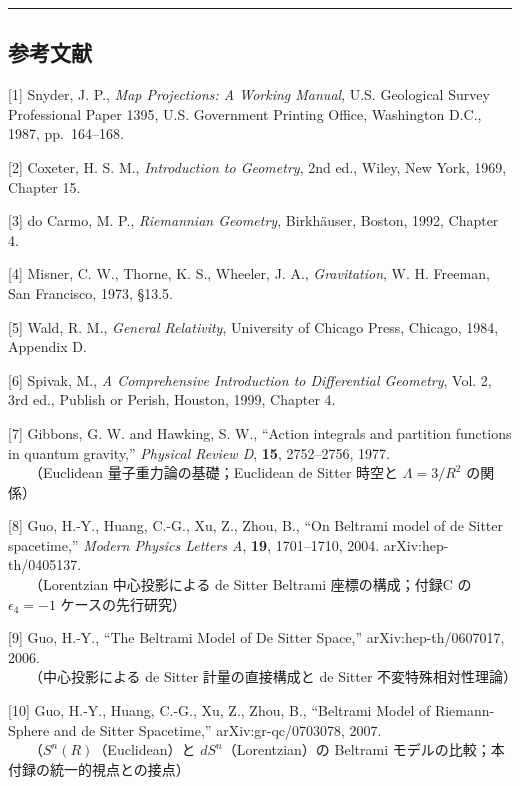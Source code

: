 \documentclass[a4paper,11pt]{ltjsarticle}
\theoremstyle{definition}
\begin{document}
\begin{center}\rule{0.5\linewidth}{0.5pt}\end{center}

\subsection{参考文献}\label{ux53c2ux8003ux6587ux732e}

{[}1{]} Snyder, J. P., \emph{Map Projections: A Working Manual}, U.S. Geological Survey Professional Paper 1395, U.S. Government Printing Office, Washington D.C., 1987, pp.~164--168.

{[}2{]} Coxeter, H. S. M., \emph{Introduction to Geometry}, 2nd ed., Wiley, New York, 1969, Chapter 15.

{[}3{]} do Carmo, M. P., \emph{Riemannian Geometry}, Birkhäuser, Boston, 1992, Chapter 4.

{[}4{]} Misner, C. W., Thorne, K. S., Wheeler, J. A., \emph{Gravitation}, W. H. Freeman, San Francisco, 1973, §13.5.

{[}5{]} Wald, R. M., \emph{General Relativity}, University of Chicago Press, Chicago, 1984, Appendix D.

{[}6{]} Spivak, M., \emph{A Comprehensive Introduction to Differential Geometry}, Vol. 2, 3rd ed., Publish or Perish, Houston, 1999, Chapter 4.

{[}7{]} Gibbons, G. W. and Hawking, S. W., ``Action integrals and partition functions in quantum gravity,'' \emph{Physical Review D}, \textbf{15}, 2752--2756, 1977.\\
　　（Euclidean 量子重力論の基礎；Euclidean de Sitter 時空と \(\Lambda = 3/R^2\) の関係）

{[}8{]} Guo, H.-Y., Huang, C.-G., Xu, Z., Zhou, B., ``On Beltrami model of de Sitter spacetime,'' \emph{Modern Physics Letters A}, \textbf{19}, 1701--1710, 2004. arXiv:hep-th/0405137.\\
　　（Lorentzian 中心投影による de Sitter Beltrami 座標の構成；付録C の \(\epsilon_4=-1\) ケースの先行研究）

{[}9{]} Guo, H.-Y., ``The Beltrami Model of De Sitter Space,'' arXiv:hep-th/0607017, 2006.\\
　　（中心投影による de Sitter 計量の直接構成と de Sitter 不変特殊相対性理論）

{[}10{]} Guo, H.-Y., Huang, C.-G., Xu, Z., Zhou, B., ``Beltrami Model of Riemann-Sphere and de Sitter Spacetime,'' arXiv:gr-qc/0703078, 2007.\\
　　（\(S^n(R)\)（Euclidean）と \(dS^n\)（Lorentzian）の Beltrami モデルの比較；本付録の統一的視点との接点）
\end{document}

